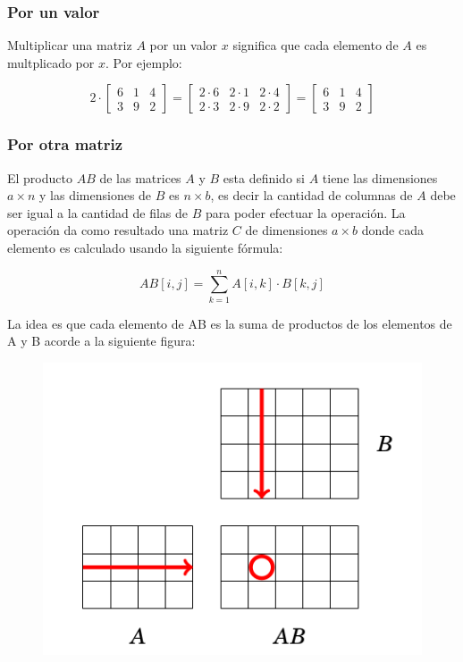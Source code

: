 \subsubsection{Por un valor}

Multiplicar una matriz $A$ por un valor $x$ significa que cada elemento de $A$ es multplicado por $x$. Por ejemplo:

$$
2 \cdot \begin{bmatrix}
	6	& 1 & 4 \\
	3 & 9 & 2
\end{bmatrix}   
 = \begin{bmatrix}
 	2 \cdot 6 & 2 \cdot 1 & 2 \cdot 4 \\
 	2 \cdot 3 & 2 \cdot 9 & 2 \cdot 2
 \end{bmatrix} =
\begin{bmatrix}
	6 & 1 & 4 \\
	3 & 9 & 2
\end{bmatrix}$$

\subsubsection{Por otra matriz}

El producto $AB$ de las matrices $A$ y $B$ esta definido si $A$ tiene las dimensiones $a\times n$ y las dimensiones de $B$ es $n \times b$, es decir la cantidad de columnas de $A$ debe ser igual a la cantidad de filas de $B$ para poder efectuar la operación. La operación da como resultado una matriz $C$ de dimensiones $a \times b$ donde cada elemento es calculado usando la siguiente fórmula:

$$ AB[i,j] = \sum_{k=1}^{n}A[i,k]\cdot B[k,j] $$




La idea es que cada elemento de AB es la suma de productos de los elementos de A y B acorde a la siguiente figura:

\begin{figure}[h!]
	\centering
	\includegraphics[width=0.5\linewidth]{img/mulmatriz}
	\label{fig:mulmatriz}
\end{figure}

